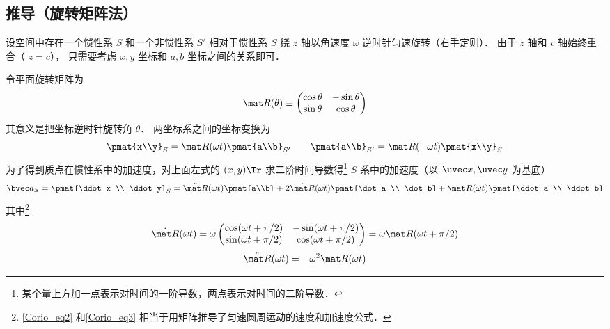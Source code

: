 \subsection{推导（旋转矩阵法）}
设空间中存在一个惯性系 $S$ 和一个非惯性系 $S'$ 相对于惯性系 $S$ 绕 $z$ 轴以角速度 $\omega$ 逆时针匀速旋转（右手定则）． 由于 $z$ 轴和 $c$ 轴始终重合（ $z=c$）， 只需要考虑 $x,y$ 坐标和 $a,b$ 坐标之间的关系即可．

令平面旋转矩阵为%
\begin{equation}
\mat R(\theta) \equiv \begin{pmatrix}
\cos \theta & - \sin \theta \\
\sin \theta & \cos \theta
\end{pmatrix}
\end{equation}
其意义是把坐标逆时针旋转角 $\theta$． 两坐标系之间的坐标变换为
\begin{equation}
\pmat{x\\y}_{S} = \mat R(\omega t) \pmat{a\\b}_{S'}
\qquad
\pmat{a\\b}_{S'} = \mat R(-\omega t) \pmat{x\\y}_{S}
\end{equation}
为了得到质点在惯性系中的加速度，对上面左式的 $(x,y)\Tr$ 求二阶时间导数得\footnote{某个量上方加一点表示对时间的一阶导数，两点表示对时间的二阶导数．} $S$ 系中的加速度（以 $\uvec x, \uvec y$ 为基底）
\begin{equation}\label{Corio_eq1}
\bvec a_{S} = \pmat{\ddot x \\ \ddot y}_{S} = 
\ddot{\mat R}(\omega t) \pmat{a\\b} + 2\dot{\mat R} (\omega t) \pmat{\dot a \\ \dot b} + \mat R(\omega t)\pmat{\ddot a \\ \ddot b}
\end{equation}
其中\footnote{\autoref{Corio_eq2} 和\autoref{Corio_eq3} 相当于用矩阵推导了匀速圆周运动的速度和加速度公式．}
\begin{equation}\label{Corio_eq2}
\dot{\mat R}(\omega t) = \omega \begin{pmatrix}
\cos(\omega t + \pi /2) &  - \sin(\omega t + \pi /2)\\
\sin(\omega t + \pi /2) & \cos(\omega t + \pi /2)
\end{pmatrix}
= \omega \mat R(\omega t + \pi /2)
\end{equation}
\begin{equation}\label{Corio_eq3}
\ddot{\mat R} (\omega t)  =  - \omega ^2 \mat R (\omega t)
\end{equation}

